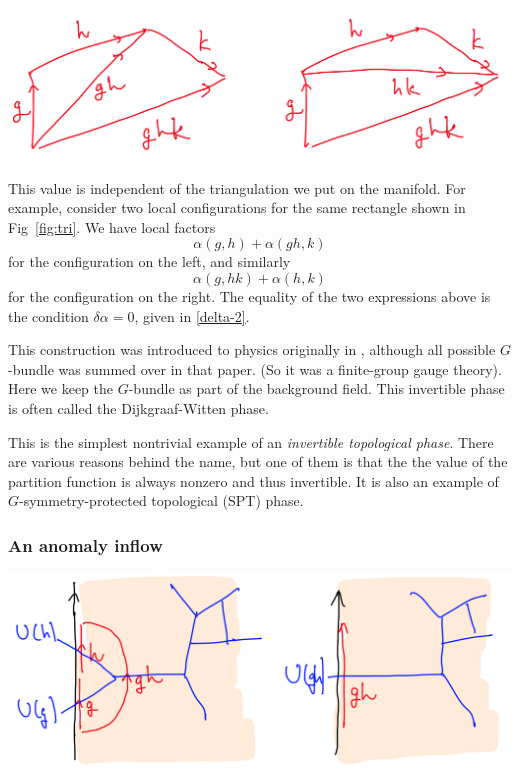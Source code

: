 \documentclass[12pt]{article}
\numberwithin{equation}{section}
\numberwithin{figure}{section}
\theoremstyle{remark}
\renewenvironment{figure}[1][]{
  \begin{originalfigure}[#1]
    \begin{mdframed}[linecolor=black!0,backgroundcolor=black!1]
}{
    \end{mdframed}
  \end{originalfigure}
}
\begin{document}
\begin{figure}[h]
\centering
 \includegraphics[scale=.2]{tri.png} 
\caption{Two triangulations of a rectangle. \label{fig:tri}}
\end{figure}

This value is independent of the triangulation we put on the manifold.
For example, consider two local configurations for the same rectangle 
shown in Fig~\ref{fig:tri}.
We have local factors \begin{equation}
\alpha(g,h)+\alpha(gh,k)
\end{equation} for the configuration on the left, and similarly \begin{equation}
\alpha(g,hk)+\alpha(h,k)
\end{equation} for the configuration on the right.
The equality of the two expressions above is the condition $\delta \alpha=0$,
given in \eqref{delta-2}.

This construction was introduced to physics originally in \cite{Dijkgraaf:1989pz},
although all possible $G$-bundle was summed over in that paper.
(So it was a finite-group gauge theory).
Here we keep the $G$-bundle as part of the background field.
This invertible phase is often called the Dijkgraaf-Witten phase.

This is the simplest nontrivial example of an \emph{invertible topological phase}.
There are various reasons behind the name, but one of them is that the 
the value of the partition function is always nonzero and thus invertible.
It is also an example of $G$-symmetry-protected topological (SPT) phase.

\subsubsection{An anomaly inflow}


\begin{figure}[h]
\centering
 \includegraphics[scale=.2]{bndry.png} 
\caption{A boundary of the 1+1d Dijkgraaf-Witten theory \label{fig:bndry}}
\end{figure}
\end{document}
